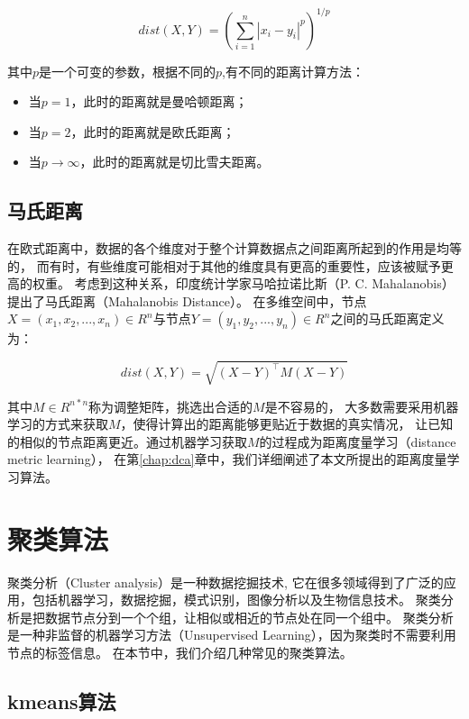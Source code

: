 \begin{equation}
    dist(X, Y) = (\sum_{i=1}^{n} |x_i - y_i|^p)^{1/p}
\end{equation}

其中$p$是一个可变的参数，根据不同的$p$,有不同的距离计算方法：

\begin{itemize}
    \item 当$p = 1$，此时的距离就是曼哈顿距离；
    \item 当$p = 2$，此时的距离就是欧氏距离；
    \item 当$p \rightarrow \infty$，此时的距离就是切比雪夫距离。
\end{itemize}

\subsection{马氏距离}

在欧式距离中，数据的各个维度对于整个计算数据点之间距离所起到的作用是均等的，
而有时，有些维度可能相对于其他的维度具有更高的重要性，应该被赋予更高的权重。
考虑到这种关系，印度统计学家马哈拉诺比斯（P. C. Mahalanobis）提出了马氏距离（Mahalanobis Distance）。
在多维空间中，节点$X = (x_1, x_2, ..., x_n) \in R ^ n$与节点$Y = (y_1, y_2, ..., y_n) \in R ^ n$之间的马氏距离定义为：

\begin{equation}
    dist(X, Y) = \sqrt{(X - Y)^\top M (X - Y)}
\end{equation}

其中$M \in R ^{n * n}$称为调整矩阵，挑选出合适的$M$是不容易的，
大多数需要采用机器学习的方式来获取$M$，使得计算出的距离能够更贴近于数据的真实情况，
让已知的相似的节点距离更近。通过机器学习获取$M$的过程成为距离度量学习（distance metric learning），
在第\ref{chap:dca}章中，我们详细阐述了本文所提出的距离度量学习算法。

\section{聚类算法}
\label{sec:cluster}

聚类分析（Cluster analysis）是一种数据挖掘技术,
它在很多领域得到了广泛的应用，包括机器学习，数据挖掘，模式识别，图像分析以及生物信息技术。
聚类分析是把数据节点分到一个个组，让相似或相近的节点处在同一个组中。
聚类分析是一种非监督的机器学习方法（Unsupervised Learning），因为聚类时不需要利用节点的标签信息。
在本节中，我们介绍几种常见的聚类算法。

\subsection{kmeans算法}

